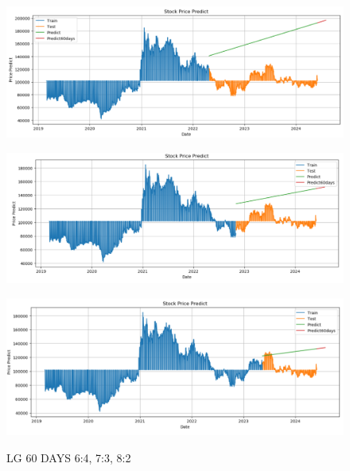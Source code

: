 \documentclass{article}
\begin{document}
\begin{multicols}{2}
\begin{figure}[H]
    \centering
    \begin{minipage}{0.15\textwidth}
    \centering
    \includegraphics[width=1\textwidth]{Image/Linear/Linear_LG_6_4_60DAYS.png}
   
    \label{fig:1}
    \end{minipage}%
    \begin{minipage}{0.15\textwidth}
    \centering
    \includegraphics[width=1\textwidth]{Image/Linear/Linear_LG_7_3_60DAYS.png}
  
    \label{fig:2}
    \end{minipage}%
    \begin{minipage}{0.15\textwidth}
    \centering
    \includegraphics[width=1\textwidth]{Image/Linear/Linear_LG_8_2_60DAYS.png}

    \label{fig:3}
    \end{minipage}
    \caption{LG 60 DAYS  6:4, 7:3, 8:2 }
\end{figure}


\end{multicols}
\end{document}
